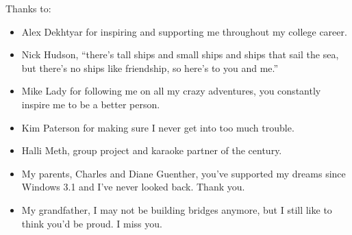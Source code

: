 \noindent
Thanks to:
\begin{itemize}
    \item Alex Dekhtyar for inspiring and supporting me throughout my college career.
    \item Nick Hudson, ``there's tall ships and small ships and ships that sail the sea, but there's no ships like friendship, so here's to you and me.''
    \item Mike Lady for following me on all my crazy adventures, you constantly inspire me to be a better person.   
    \item Kim Paterson for making sure I never get into too much trouble.
    \item Halli Meth, group project and karaoke partner of the century.
    \item My parents, Charles and Diane Guenther, you've supported my dreams since Windows 3.1 and I've never looked back. Thank you.
    \item My grandfather, I may not be building bridges anymore, but I still like to think you'd be proud. I miss you.
\end{itemize}